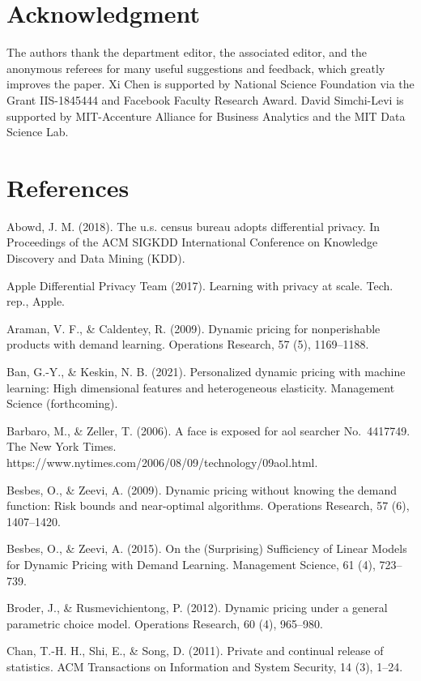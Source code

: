 \section{Acknowledgment}\label{acknowledgment}

The authors thank the department editor, the associated editor, and the anonymous referees for many useful suggestions and feedback, which greatly improves the paper. Xi Chen is supported by National Science Foundation via the Grant IIS-1845444 and Facebook Faculty Research Award. David Simchi-Levi is supported by MIT-Accenture Alliance for Business Analytics and the MIT Data Science Lab.

\section{References}\label{references}

Abowd, J. M. (2018). The u.s. census bureau adopts differential privacy. In Proceedings of the ACM SIGKDD International Conference on Knowledge Discovery and Data Mining (KDD).

Apple Differential Privacy Team (2017). Learning with privacy at scale. Tech. rep., Apple.

Araman, V. F., \& Caldentey, R. (2009). Dynamic pricing for nonperishable products with demand learning. Operations Research, 57 (5), 1169--1188.

Ban, G.-Y., \& Keskin, N. B. (2021). Personalized dynamic pricing with machine learning: High dimensional features and heterogeneous elasticity. Management Science (forthcoming).

Barbaro, M., \& Zeller, T. (2006). A face is exposed for aol searcher No.~4417749. The New York Times. https://www.nytimes.com/2006/08/09/technology/09aol.html.

Besbes, O., \& Zeevi, A. (2009). Dynamic pricing without knowing the demand function: Risk bounds and near-optimal algorithms. Operations Research, 57 (6), 1407--1420.

Besbes, O., \& Zeevi, A. (2015). On the (Surprising) Sufficiency of Linear Models for Dynamic Pricing with Demand Learning. Management Science, 61 (4), 723--739.

Broder, J., \& Rusmevichientong, P. (2012). Dynamic pricing under a general parametric choice model. Operations Research, 60 (4), 965--980.

Chan, T.-H. H., Shi, E., \& Song, D. (2011). Private and continual release of statistics. ACM Transactions on Information and System Security, 14 (3), 1--24.

